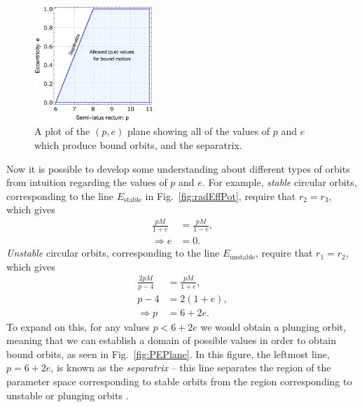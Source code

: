 \begin{figure}
    \centering
    \includegraphics[width=0.4\textwidth]{images/PEPlane.pdf}
    \caption[Plot of $(p,e)$-plane with separatrix]{A plot of the $(p,e)$ plane showing all of the values of $p$ and $e$ which produce bound orbits, and the separatrix.}
    \label{fig:PEPlane}
\end{figure}
\noindent
Now it is possible to develop some understanding about different types of orbits from intuition regarding the values of $p$ and $e$.
For example, \textit{stable} circular orbits, corresponding to the line $E_\text{stable}$ in Fig.~\eqref{fig:radEffPot}, require that $r_2=r_3$, which gives
\begin{align}
    \frac{pM}{1+e}&=\frac{pM}{1-e},\\
    \Rightarrow e&=0.
\end{align}
\noindent
\textit{Unstable} circular orbits, corresponding to the line $E_\text{unstable}$, require that $r_1=r_2$, which gives
\begin{align}
    \frac{2pM}{p-4}&=\frac{pM}{1+e},\\
    p-4&=2(1+e),\\
    \Rightarrow p&=6+2e.
\end{align}
To expand on this, for any values $p<6+2e$ we would obtain a plunging orbit, meaning that we can establish a domain of possible values in order to obtain bound orbits, as seen in Fig.~\eqref{fig:PEPlane}.
In this figure, the leftmost line, $p=6+2e$, is known as the \textit{separatrix} -- this line separates the region of the parameter space corresponding to stable orbits from the region corresponding to unstable or plunging orbits \cite{nielsLastStableOrbit}.\\


